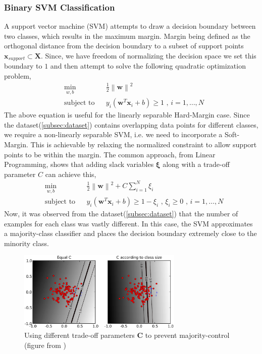 \documentclass[fleqn]{article}
\begin{document}
\subsubsection{Binary SVM Classification}
\label{sub:binarySVM}
A support vector machine (SVM) attempts to draw a decision boundary between two classes, which results in the maximum margin\cite{bishop:2006}.  Margin being defined as the orthogonal distance from the decision boundary to a subset of support points $\mathbf{x}_{support} \subset \mathbf{X}$.  Since, we have freedom of normalizing the decision space we set this boundary to $1$ and then attempt to solve the following quadratic optimization problem,
%  
\begin{equation}
\label{eq:SVM}
\begin{aligned}
	& \underset{w,b}{\text{min}}
	& & \frac{1}{2} \left\|\mathbf{w}\right\|^2 \\
	& \text{subject to}
	& & y_i\left(\mathbf{w}^T \mathbf{x}_i + b\right) \geq 1 \text{ , } i = 1,\dots,N
\end{aligned}
\end{equation}
%
The above equation is useful for the linearly separable Hard-Margin case.  Since the dataset(\ref{subsec:dataset}) contains overlapping data points for different classes, we require a non-linearly separable SVM, i.e. we need to incorporate a Soft-Margin.  This is achievable by relaxing the normalized constraint to allow support points to be within the margin\cite{UsersGuideSVM}.  The common approach, from Linear Programming, shows that adding slack variables $\boldsymbol{\xi}$ along with a trade-off parameter $C$ can achieve this,
%
\begin{equation}
\label{eq:SVM_soft}
\begin{aligned}
	& \underset{w,b}{\text{min}}
	& & \frac{1}{2} \left\|\mathbf{w}\right\|^2 + C \sum_{i=1}^N \xi_i\\
	& \text{subject to}
	& & y_i\left(\mathbf{w}^T \mathbf{x}_i + b\right) \geq 1 - \xi_i \text{ , } \xi_i \geq 0 \text{ , } i = 1,\dots,N 
\end{aligned}
\end{equation}
%
Now, it was observed from the dataset(\ref{subsec:dataset}) that the number of examples for each class was vastly different.  In this case, the SVM approximates a majority-class classifier and places the decision boundary extremely close to the minority class.
%
\begin{figure}[H]
	{\centering
		\includegraphics[trim = 2mm 2mm 2mm 2mm, clip,width=0.7\textwidth]{figs/DifferentC}
		\caption{Using different trade-off parameters $\mathbf{C}$ to prevent majority-control (figure from \cite{UsersGuideSVM})}
		\label{fig:Different_SVM_C_size}
	}
\end{figure}
\end{document}
